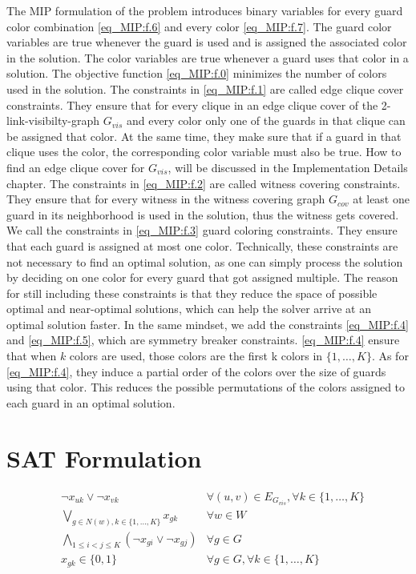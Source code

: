 The MIP formulation of the problem introduces binary variables for every guard color combination \cref{eq_MIP:f.6} and every color \cref{eq_MIP:f.7}. The guard color variables are true whenever the guard is used and is assigned the associated color in the solution. The color variables are true whenever a guard uses that color in a solution. The objective function \cref{eq_MIP:f.0} minimizes the number of colors used in the solution. The constraints in \cref{eq_MIP:f.1} are called edge clique cover constraints. They ensure that for every clique in an edge clique cover of the 2-link-visibilty-graph $G_{vis}$ and every color only one of the guards in that clique can be assigned that color. At the same time, they make sure that if a guard in that clique uses the color, the corresponding color variable must also be true. How to find an edge clique cover for $G_{vis}$, will be discussed in the Implementation Details chapter. The constraints in \cref{eq_MIP:f.2} are called witness covering constraints. They ensure that for every witness in the witness covering graph $G_{cov}$ at least one guard in its neighborhood is used in the solution, thus the witness gets covered. We call the constraints in \cref{eq_MIP:f.3} guard coloring constraints. They ensure that each guard is assigned at most one color. Technically, these constraints are not necessary to find an optimal solution, as one can simply process the solution by deciding on one color for every guard that got assigned multiple. The reason for still including these constraints is that they reduce the space of possible optimal and near-optimal solutions, which can help the solver arrive at an optimal solution faster. In the same mindset, we add the constraints \cref{eq_MIP:f.4} and \cref{eq_MIP:f.5}, which are symmetry breaker constraints. \cref{eq_MIP:f.4} ensure that when $k$ colors are used, those colors are the first k colors in $\{1,\ldots,K\}$. As for \cref{eq_MIP:f.4}, they induce a partial order of the colors over the size of guards using that color. This reduces the possible permutations of the colors assigned to each guard in an optimal solution.

\section{SAT Formulation}

\begin{align}
\label{eq_SAT:f.0}&\lnot x_{uk} \lor \lnot x_{vk} & \forall (u,v)\in E_{G_{vis}}, \forall k\in \{1,\ldots,K\}\\
\label{eq_SAT:f.1}&\bigvee_{g\in N(w), k\in \{1,\ldots,K\}}x_{gk} & \forall w\in W\\
\label{eq_SAT:f.2}&\bigwedge_{1 \leq i < j \leq K} (\lnot x_{gi} \lor \lnot x_{gj}) & \forall g\in G\\
\label{eq:_SATf.3}& x_{gk} \in \{0,1\} & \forall g\in G, \forall k\in \{1,\ldots,K\}
\end{align}


